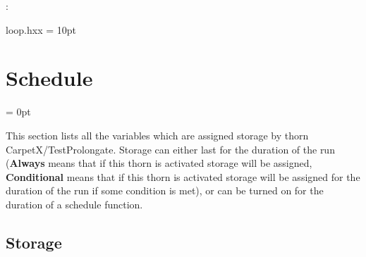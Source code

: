 : 

loop.hxx
\vspace{2mm}\parskip = 10pt 

\section{Schedule} 


\parskip = 0pt


\noindent This section lists all the variables which are assigned storage by thorn CarpetX/TestProlongate.  Storage can either last for the duration of the run ({\bf Always} means that if this thorn is activated storage will be assigned, {\bf Conditional} means that if this thorn is activated storage will be assigned for the duration of the run if some condition is met), or can be turned on for the duration of a schedule function.


\subsection*{Storage}

\hspace{5mm}

